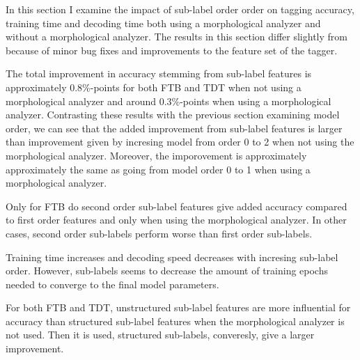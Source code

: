 In this section I examine the impact of sub-label order order on
tagging accuracy, training time and decoding time both using a
morphological analyzer and without a morphological analyzer. The
results in this section differ slightly from \cite{Silfverberg2015}
because of minor bug fixes and improvements to the feature set of the
tagger.

The total improvement in accuracy stemming from sub-label features is
approximately 0.8\%-points for both FTB and TDT when not using a
morphological analyzer and around 0.3\%-points when using a
morphological analyzer. Contrasting these results with the previous
section examining model order, we can see that the added improvement
from sub-label features is larger than improvement given by incresing
model from order 0 to 2 when not using the morphological
analyzer. Moreover, the imporovement is approximately approximately
the same as going from model order 0 to 1 when using a morphological
analyzer.

Only for FTB do second order sub-label features give added accuracy
compared to first order features and only when using the morphological
analyzer. In other cases, second order sub-labels perform worse than
first order sub-labels.

Training time increases and decoding speed decreases with incresing
sub-label order. However, sub-labels seems to decrease the amount of
training epochs needed to converge to the final model parameters.

For both FTB and TDT, unstructured sub-label features are more
influential for accuracy than structured sub-label features when the
morphological analyzer is not used. Then it is used, structured
sub-labels, converesly, give a larger improvement.

